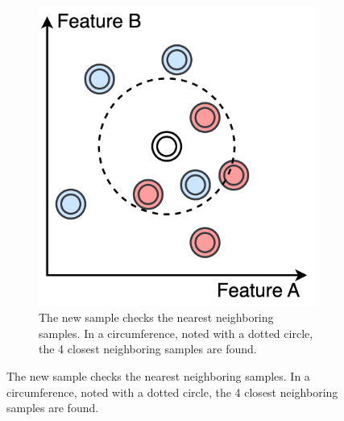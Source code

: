 \begin{figure}[htb]
{\begin{subfigure}[b]{0.37\textwidth}
             \end{subfigure}
             \hspace{0.015\textwidth}
             \begin{subfigure}[b]{0.37\textwidth}
                 \centering
                 \includegraphics[width=\textwidth]{images/knn_2.png}
                 \caption{The new sample checks the nearest neighboring samples. In a circumference, noted with a dotted circle, the 4 closest neighboring samples are found.}
                

\end{subfigure}}
\end{figure}
